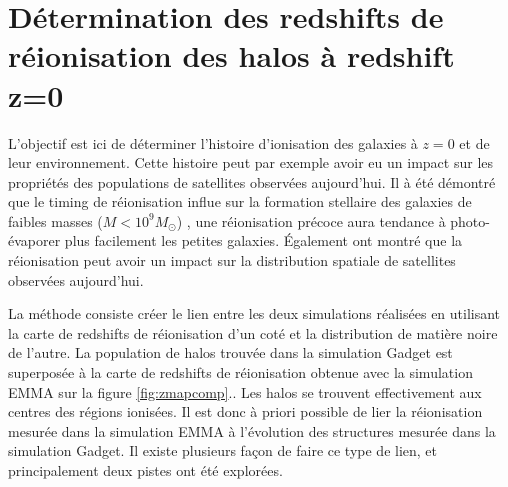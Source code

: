 \section{Détermination des redshifts de réionisation des halos à redshift z=0}

L'objectif est ici de déterminer l'histoire d'ionisation des galaxies à $z=0$ et de leur environnement.
Cette histoire peut par exemple avoir eu un impact sur les propriétés des populations de satellites observées aujourd'hui.
Il à été démontré que le timing de réionisation influe sur la formation stellaire des galaxies de faibles masses ($M<10^9M_\odot$) \citep{ocvirk_reionization_2014}, une réionisation précoce aura tendance à photo-évaporer plus facilement les petites galaxies.
Également \citep{2015ApJ...800...34G} ont montré que la réionisation peut avoir un impact sur la distribution spatiale de satellites observées aujourd'hui.


La méthode consiste créer le lien entre les deux simulations réalisées en utilisant la carte de redshifts de réionisation d'un coté et la distribution de matière noire de l'autre.
La population de halos trouvée dans la simulation Gadget est superposée à la carte de redshifts de réionisation obtenue avec la simulation EMMA sur la figure \ref{fig:zmapcomp}..
Les halos se trouvent effectivement aux centres des régions ionisées.
Il est donc à priori possible de lier la réionisation mesurée dans la simulation EMMA à l'évolution des structures mesurée dans la simulation Gadget.
Il existe plusieurs façon de faire ce type de lien, et principalement deux pistes ont été explorées.


